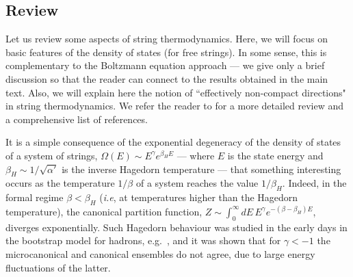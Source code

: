 \documentclass[a4paper,11pt]{article}
\begin{document}
\subsection*{Review}

  Let us review some  aspects of string thermodynamics. Here, we will focus on basic features of the density of states (for free strings). In some sense, this is complementary
to the Boltzmann equation approach --- we give only a brief discussion so that the reader can connect to the results obtained in the main text.
Also, we will explain here the notion of ``effectively non-compact directions" in string thermodynamics. We refer the reader to
\cite{Mertens:2015ola} for a more detailed review 
and a comprehensive list of references.

It is a simple consequence of the exponential degeneracy of the density of states of a system of strings, $\Omega(E)\sim E^\gamma e^{\beta_H E}$
--- where $E$ is the state energy and $\beta_H\sim 1/\sqrt{\alpha'}$ is the inverse Hagedorn temperature ---
that something interesting occurs as the temperature $1/\beta$ of a system reaches the value $1/\beta_H$.
Indeed, in the formal regime $\beta < \beta_H$ (\textit{i.e}, at temperatures higher than the Hagedorn temperature),
the canonical partition function, $Z\sim \int_0^\infty{dE\, E^\gamma e^{-(\beta-\beta_H) E}}$, diverges exponentially.
Such Hagedorn behaviour was studied in the early days in the bootstrap model for hadrons, e.g.~\cite{Hagedorn:1965st, Hagedorn:1967tlw, Hagedorn:1967dia, Hagedorn:1971mc, Frautschi:1971ij, PhysRevD.5.3231, Cabibbo:1975ig}, and it was shown that for $\gamma<-1$ the microcanonical and canonical ensembles do not agree, due to large energy fluctuations of the latter. 
\end{document}
